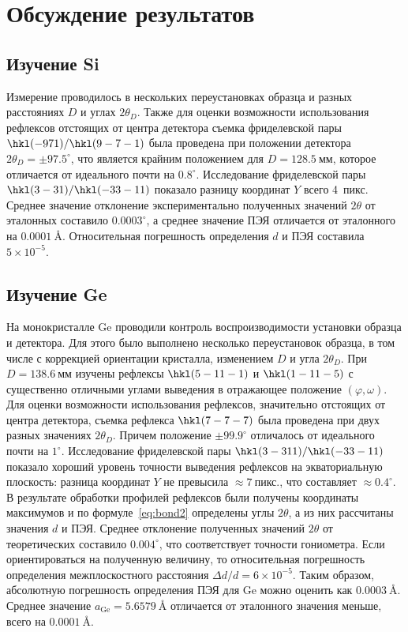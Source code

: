 \documentclass[a4paper,14pt]{extarticle}
\newcommand{\unit}[1]{ \ \text{#1}}
\newcommand{\degree}{^\circ}
\begin{document}
\section{Обсуждение результатов}
\subsection{Изучение Si}
Измерение проводилось в нескольких переустановках образца и разных расстояниях $D$ и углах $2\theta_D$.
Также для оценки возможности использования рефлексов отстоящих от центра детектора съемка фриделевской пары $\hkl(-9 7 1)/\hkl(9 -7 -1)$ была проведена при положении детектора $2\theta_D = \pm 97.5\degree$, что является крайним положением для $D = 128.5\unit{мм}$, которое отличается от идеального почти на $0.8\degree$.
Исследование фриделевской пары $\hkl(3 -3 1)/\hkl(-3 3 -11)$ показало разницу координат $Y$ всего 4~пикс.
Среднее значение отклонение экспериментально полученных значений $2\theta$ от эталонных составило $0.0003\degree$, а среднее значение ПЭЯ отличается от эталонного на $0.0001\unit{\AA}$.
Относительная погрешность определения $d$ и ПЭЯ составила $5 \times 10^{-5}$.
\subsection{Изучение Ge}
На монокристалле Ge проводили контроль воспроизводимости установки образца и детектора.
Для этого было выполнено несколько переустановок образца, в том числе с коррекцией ориентации кристалла, изменением $D$ и угла $2\theta_D$.
При $D = 138.6\unit{мм}$ изучены рефлексы $\hkl(5 -11 -1)$ и $\hkl(1 -11 -5)$ с существенно отличными углами выведения в отражающее положение $(\varphi, \omega)$.
Для оценки возможности использования рефлексов, значительно отстоящих от центра детектора, съемка рефлекса $\hkl(7 -7 -7)$ была проведена при двух разных значениях $2\theta_D$.
Причем положение $\pm 99.9\degree$ отличалось от идеального почти на $1\degree$.
Исследование фриделевской пары $\hkl(3 -3 11)/\hkl(-3 3 -11)$ показало хороший уровень точности выведения рефлексов на экваториальную плоскость: разница координат $Y$ не превысила $\approx 7\unit{пикс.}$, что составляет $\approx 0.4\degree$.
В результате обработки профилей рефлексов были получены координаты максимумов и по формуле~\ref{eq:bond2} определены углы $2\theta$, а из них рассчитаны значения $d$ и ПЭЯ.
Среднее отклонение полученных значений $2\theta$ от теоретических составило $0.004\degree$, что соответствует точности гониометра.
Если ориентироваться на полученную величину, то относительная погрешность определения межплоскостного расстояния $\Delta d / d = 6 \times 10^{-5}$.
Таким образом, абсолютную погрешность определения ПЭЯ для Ge можно оценить как $0.0003\unit{\AA}$.
Среднее значение $a_\text{Ge} = 5.6579\unit{\AA}$ отличается от эталонного значения меньше, всего на $0.0001\unit{\AA}$.
\end{document}
